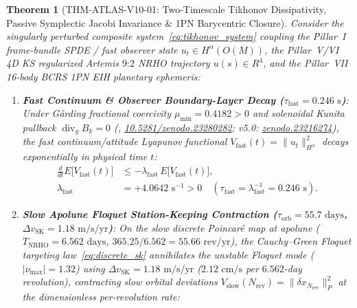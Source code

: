 \documentclass[11pt,a4paper,reqno]{article}
\def\bm#1{#1}%
\def\texttt#1{#1}%
\def\mathcal#1{#1}%
\def\mathbb#1{#1}%
\newcommand{\zenodo}[1]{\href{https://doi.org/10.5281/zenodo.#1}{\texttt{10.5281/\allowbreak zenodo.#1}}}
\newcommand{\zenodoshort}[1]{\href{https://doi.org/10.5281/zenodo.#1}{\texttt{zenodo.#1}}}
\theoremstyle{plain}
\newtheorem{theorem}{Theorem}[section]
\theoremstyle{definition}
\theoremstyle{remark}
\numberwithin{equation}{section}
\begin{document}
\begin{theorem}[{\texttt{THM-ATLAS-V10-01}: Two-Timescale Tikhonov Dissipativity, Passive Symplectic Jacobi Invariance \& 1PN Barycentric Closure}]
\label{thm:dynamical_unification}
Consider the singularly perturbed composite system~\eqref{eq:tikhonov_system} coupling the Pillar~I frame-bundle SPDE / fast observer state $u_t \in \mathbb{H}^\alpha(\mathcal{O}(\mathcal{M}))$, the Pillar~V/VI 4D KS regularized Artemis $9\text{:}2$ NRHO trajectory $\bm{u}(s) \in \mathbb{R}^4$, and the Pillar~VII 16-body BCRS 1PN EIH planetary ephemeris:
\begin{enumerate}[leftmargin=1.8em,itemsep=2pt]
  \item \textbf{Fast Continuum \& Observer Boundary-Layer Decay ($\tau_{\text{fast}} = 0.246\text{ s}$)}: Under G\r{a}rding fractional coercivity $\mu_{\min} = 0.4182 > 0$ and solenoidal Kunita pullback $\operatorname{div}_g B_k = 0$ (\cite{PillarI_SPDE_v6,UnmaniSPDE50}, \zenodo{23280282}; v5.0: \zenodoshort{23216274}), the fast continuum/attitude Lyapunov functional $\mathcal{V}_{\text{fast}}(t) = \|u_t\|_{\mathbb{H}^\alpha}^2$ decays exponentially in physical time $t$:
  \begin{equation}
  \label{eq:fast_lyapunov_decay}
  \begin{aligned}
    \frac{d}{dt}\mathbb{E}\big[\mathcal{V}_{\text{fast}}(t)\big] &\le -\lambda_{\text{fast}}\,\mathbb{E}\big[\mathcal{V}_{\text{fast}}(t)\big], \\
    \lambda_{\text{fast}} &= +4.0642\text{ s}^{-1} > 0 \quad (\tau_{\text{fast}} = \lambda_{\text{fast}}^{-1} = 0.246\text{ s}).
  \end{aligned}
  \end{equation}
  \item \textbf{Slow Apolune Floquet Station-Keeping Contraction ($\tau_{\text{orb}} = 55.7\text{ days}$, $\Delta v_{\text{SK}} = 1.18\text{ m/s/yr}$)}: On the slow discrete Poincar\'{e} map at apolune ($T_{\text{NRHO}} = 6.562\text{ days}$, $365.25/6.562 = 55.66\text{ rev/yr}$), the Cauchy--Green Floquet targeting law~\eqref{eq:discrete_sk} annihilates the unstable Floquet mode ($|\nu_{\max}| = 1.32$) using $\Delta v_{\text{SK}} = 1.18\text{ m/s/yr}$ ($2.12\text{ cm/s}$ per $6.562$-day revolution), contracting slow orbital deviations $\mathcal{V}_{\text{slow}}(N_{\text{rev}}) = \|\delta\bm{x}_{N_{\text{rev}}}\|_{\bm{P}}^2$ at the dimensionless per-revolution rate:
  \begin{equation}
  \label{eq:slow_floquet_decay}
  \begin{aligned}

\end{aligned}
\end{equation}
\end{enumerate}
\end{theorem}
\end{document}
